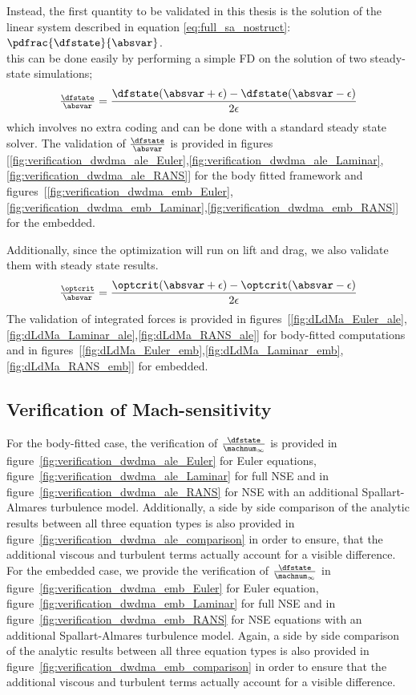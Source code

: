 \documentclass[../main.tex]{subfiles}
\begin{document}
Instead, the first quantity to be validated in this thesis is the solution of the linear system described in equation \eqref{eq:full_sa_nostruct}: $\pdfrac{\dfstate}{\absvar}$.\\
this can be done easily by performing a simple \ac{FD} on the solution of two steady-state simulations;
\begin{align}
\tfrac{\dfstate}{\absvar}=\frac{\dfstate(\absvar+\epsilon)-\dfstate(\absvar-\epsilon)}{2 \epsilon}
\end{align}
which involves no extra coding and can be done with a standard steady state solver.
The validation of $\tfrac{\dfstate}{\absvar}$ is provided in figures [\ref{fig:verification_dwdma_ale_Euler},\ref{fig:verification_dwdma_ale_Laminar},\ref{fig:verification_dwdma_ale_RANS}] for the body fitted framework and figures~[\ref{fig:verification_dwdma_emb_Euler},\ref{fig:verification_dwdma_emb_Laminar},\ref{fig:verification_dwdma_emb_RANS}] for the embedded.

Additionally, since the optimization will run on lift and drag, we also validate them with steady state results.
\begin{align}
\tfrac{\optcrit}{\absvar}=\frac{\optcrit(\absvar+\epsilon)-\optcrit(\absvar-\epsilon)}{2 \epsilon}
\end{align}
The validation of integrated forces is provided in figures~[\ref{fig:dLdMa_Euler_ale},\ref{fig:dLdMa_Laminar_ale},\ref{fig:dLdMa_RANS_ale}] for body-fitted computations and in figures~[\ref{fig:dLdMa_Euler_emb},\ref{fig:dLdMa_Laminar_emb},\ref{fig:dLdMa_RANS_emb}] for embedded.



\subsection{Verification of Mach-sensitivity}
For the body-fitted case, the verification of $\tfrac{\dfstate}{\machnum_{\infty}}$ is provided in figure~\ref{fig:verification_dwdma_ale_Euler} for Euler equations, figure~\ref{fig:verification_dwdma_ale_Laminar} for full \ac{NSE} and in figure~\ref{fig:verification_dwdma_ale_RANS} for \ac{NSE} with an additional Spallart-Almares turbulence model.
Additionally, a side by side comparison of the analytic results between all three equation types is also provided in figure~\ref{fig:verification_dwdma_ale_comparison} in order to ensure, that the additional viscous and turbulent terms actually account for a visible difference.\\
For the embedded case, we provide the verification of $\tfrac{\dfstate}{\machnum_{\infty}}$  in figure~\ref{fig:verification_dwdma_emb_Euler} for Euler equation, figure~\ref{fig:verification_dwdma_emb_Laminar} for full \ac{NSE} and in figure~\ref{fig:verification_dwdma_emb_RANS} for \ac{NSE} equations with an additional Spallart-Almares turbulence model.
Again, a side by side comparison of the analytic results between all three equation types is also provided in figure~\ref{fig:verification_dwdma_emb_comparison} in order to ensure that the additional viscous and turbulent terms actually account for a visible difference.
\end{document}
